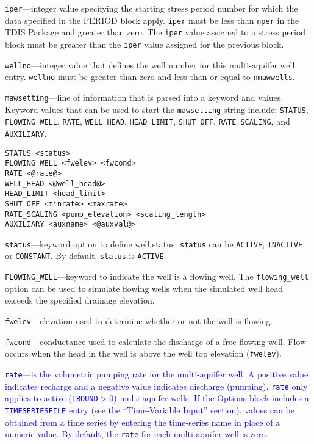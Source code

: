 \item \texttt{iper}---integer value specifying the starting stress period number for which the data specified in the PERIOD block apply.  \texttt{iper} must be less than \texttt{nper} in the TDIS Package and greater than zero.  The \texttt{iper} value assigned to a stress period block must be greater than the \texttt{iper} value assigned for the previous block.

\item \texttt{wellno}---integer value that defines the well number for this multi-aquifer well entry. \texttt{wellno} must be greater than zero and less than or equal to \texttt{nmawwells}.

\item \texttt{mawsetting}---line of information that is parsed into a keyword and values.  Keyword values that can be used to start the \texttt{mawsetting} string include: \texttt{STATUS}, \texttt{FLOWING\_WELL}, \texttt{RATE}, \texttt{WELL\_HEAD}, \texttt{HEAD\_LIMIT}, \texttt{SHUT\_OFF}, \texttt{RATE\_SCALING}, and \texttt{AUXILIARY}.

\begin{lstlisting}[style=blockdefinition]
STATUS <status>
FLOWING_WELL <fwelev> <fwcond> 
RATE <@rate@>
WELL_HEAD <@well_head@>
HEAD_LIMIT <head_limit>
SHUT_OFF <minrate> <maxrate> 
RATE_SCALING <pump_elevation> <scaling_length> 
AUXILIARY <auxname> <@auxval@> 
\end{lstlisting}

\item \texttt{status}---keyword option to define well status.  \texttt{status} can be \texttt{ACTIVE}, \texttt{INACTIVE}, or \texttt{CONSTANT}. By default, \texttt{status} is \texttt{ACTIVE}.

\item \texttt{FLOWING\_WELL}---keyword to indicate the well is a flowing well.  The \texttt{flowing\_well} option can be used to simulate flowing wells when the simulated well head exceeds the specified drainage elevation.

\item \texttt{fwelev}---elevation used to determine whether or not the well is flowing.

\item \texttt{fwcond}---conductance used to calculate the discharge of a free flowing well.  Flow occurs when the head in the well is above the well top elevation (\texttt{fwelev}).

\item \textcolor{blue}{\texttt{rate}---is the volumetric pumping rate for the multi-aquifer well. A positive value indicates recharge and a negative value indicates discharge (pumping). \texttt{rate} only applies to active (\texttt{IBOUND}$>0$) multi-aquifer wells. If the Options block includes a \texttt{TIMESERIESFILE} entry (see the ``Time-Variable Input'' section), values can be obtained from a time series by entering the time-series name in place of a numeric value. By default, the \texttt{rate} for each multi-aquifer well is zero.}

